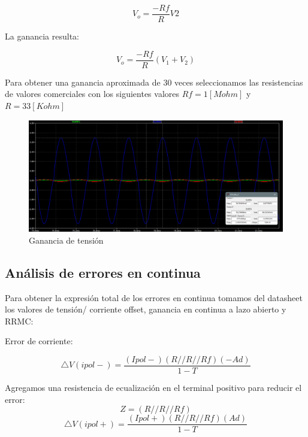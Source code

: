\documentclass[12pt]{article}
\begin{document}
	\begin{equation}
		V_{o}=\frac{-Rf}{R}V2
	\end{equation}
	
	La ganancia resulta:
	
	\begin{equation}
		V_{o}=\frac{-Rf}{R}(V_{1}+V_{2})
	\end{equation}
	
	Para obtener una ganancia aproximada de 30 veces seleccionamos las resistencias de valores comerciales con los siguientes valores $Rf=1[Mohm]$ y $R=33[Kohm]$
	
	\begin{figure}[h]
		\includegraphics[width=\linewidth]{Imagenes_simulaciones/Sim_V1_0.1__V2_0.02}
		\caption[Ganancia de tensión]{Ganancia de tensión}
		\label{fig:simv10}
	\end{figure}
	
	\subsection{Análisis de errores en continua}
	Para obtener la expresión total de los errores en continua tomamos del datasheet los valores de tensión/ corriente offset, ganancia en continua a lazo abierto y RRMC:
	
	Error de corriente:
	
	\begin{equation}
		\bigtriangleup V(ipol-) =\frac{(Ipol-)(R//R//Rf)(-Ad)}{1-T}
	\end{equation}
	
	Agregamos una resistencia de ecualización en el terminal positivo para reducir el error:
	\begin{equation}
		Z=(R//R//Rf)
	\end{equation}
	\begin{equation}
			\bigtriangleup V(ipol+) =\frac{(Ipol+)(R//R//Rf)(Ad)}{1-T}
	\end{equation}
\end{document}
